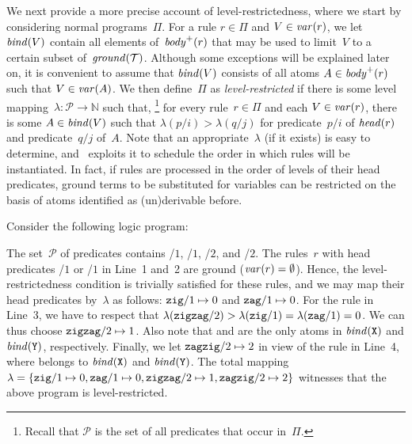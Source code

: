 \begin{oldstuff}
We next provide a more precise account of level-restrictedness,
where we start by considering normal programs~$\Pi$.
For a rule $r\in\Pi$ and $V\in\vars{r}$,
we let $\binders{V}{r}$ contain all elements of~$\pbody{r}$ that may be used to
limit~$V$ to a certain subset of~$\ground{\mathcal{T}}$.
Although some exceptions will be explained later on,
it is convenient to assume that $\binders{V}{r}$ consists of all atoms $A\in\pbody{r}$
such that $V\in\vars{A}$.
We then %
define~$\Pi$ as \emph{level-restricted}
if there is some level mapping~$\lambda:\mathcal{P}\rightarrow\mathbb{N}$ such that,%
\footnote{Recall that $\mathcal{P}$ is the set of all predicates that occur in~$\Pi$.}
for every rule~$r\in\Pi$ and each $V\in\vars{r}$,
there is some $A\in\binders{V}{r}$ such that $\lambda(p/i)>\lambda(q/j)$
for predicate~$p/i$ of $\head{r}$ and predicate~$q/j$ of~$A$.
Note that an appropriate~$\lambda$ (if it exists) is easy to determine,
and \gringo\ exploits it to schedule the order in which rules will be instantiated.
In fact, if rules are processed in the order of levels of their head predicates,
ground  terms to be substituted for variables can be restricted
on the basis of atoms identified as (un)derivable before.

\begin{example}\label{ex:lambda}
Consider the following logic program:
%

%
The set~$\mathcal{P}$ of predicates contains
/$1$, /$1$,
/$2$, and /$2$.
The rules~$r$ with head predicates /$1$ or /$1$ in Line~1 and~2
are ground ($\vars{r}=\nolinebreak\emptyset$).
Hence, the level-restrictedness condition is trivially satisfied for these rules,
and we may map their head predicates by~$\lambda$ as follows:
$\pred{zig}/1 \mapsto 0$ and $\pred{zag}/1 \mapsto 0$.
For the rule in Line~3,
we have to respect that
$\lambda(\pred{zigzag}/2) > \lambda(\pred{zig}/1) = \lambda(\pred{zag}/1) =\nolinebreak 0$.
We can thus choose $\pred{zigzag}/2\mapsto 1$.
Also note that  and  are
the only atoms in $\binders{\var{X}}{}$ and $\binders{\var{Y}}{}$, respectively.
Finally, we let $\pred{zagzig}/2\mapsto 2$ in view of the rule in Line~4,
where  belongs to
$\binders{\var{X}}{}$ and $\binders{\var{Y}}{}$.
The total mapping
\(
\lambda=
\{
\pred{zig}/1 \mapsto 0,
\pred{zag}/1 \mapsto 0,
\pred{zigzag}/2\mapsto 1,
\pred{zagzig}/2\mapsto 2
\}
\)
witnesses that the above program is level-restricted.


\end{example}
\end{oldstuff}
